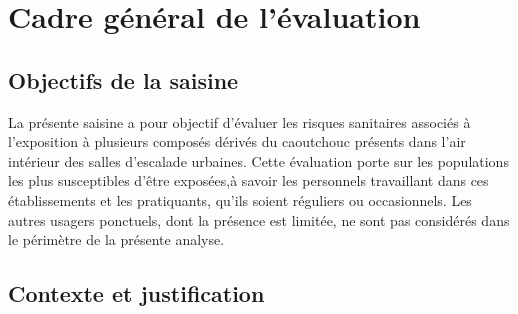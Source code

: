 \documentclass[pdflatex,sn-basic]{sn-jnl}%
\begin{document}
\section{Cadre général de l'évaluation}
\label{sec1}

\subsection{Objectifs de la saisine}
\label{subsec1}

La présente saisine a pour objectif d'évaluer les risques sanitaires associés à l'exposition à plusieurs composés dérivés du caoutchouc présents dans l'air intérieur des salles d'escalade urbaines. Cette évaluation porte sur les populations les plus susceptibles d'être exposées,à savoir les personnels travaillant dans ces établissements et les pratiquants, qu'ils soient réguliers ou occasionnels. Les autres usagers ponctuels, dont la présence est limitée, ne sont pas considérés dans le périmètre de la présente analyse.

\subsection{Contexte et justification}
\label{subsec2}
\end{document}
